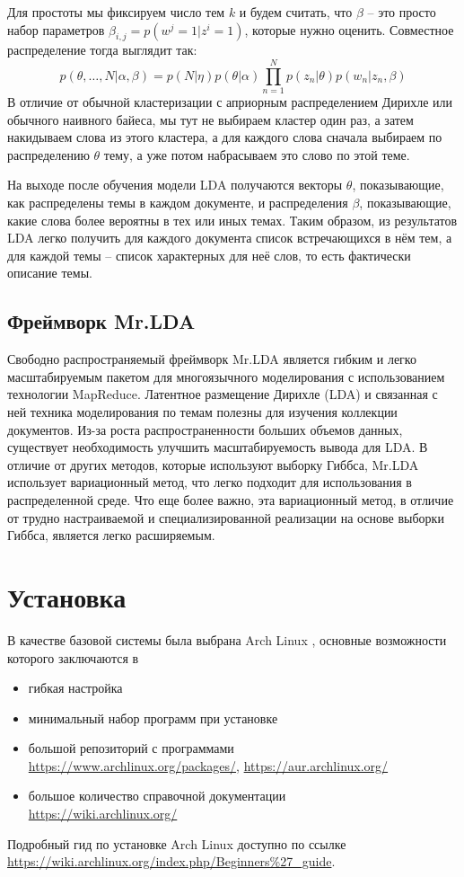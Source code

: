 Для простоты мы фиксируем число тем \( k \) и будем считать, что \( \beta \) -- это просто набор параметров 
\( \beta_{i,j} = p(w^j = 1 | z^i = 1)\), которые нужно оценить. Совместное распределение тогда выглядит так:
\[
    p(\theta,\ldots,N|\alpha,\beta) = 
        p(N|\eta)p(\theta|\alpha)\prod\limits_{n=1}^{N}p(z_n|\theta)p(w_n|z_n,\beta)
\]
В отличие от обычной кластеризации с априорным распределением Дирихле или обычного наивного байеса, мы тут 
не выбираем кластер один раз, а затем накидываем слова из этого кластера, а для каждого слова сначала 
выбираем по распределению \( \theta \) тему, а уже потом набрасываем это слово по этой теме.

На выходе после обучения модели LDA получаются векторы \( \theta \), показывающие, как распределены темы в 
каждом документе, и распределения \( \beta \), показывающие, какие слова более вероятны в тех или иных 
темах. Таким образом, из результатов LDA легко получить для каждого документа список встречающихся в нём 
тем, а для каждой темы -- список характерных для неё слов, то есть фактически описание темы.\cite{lda}

\section{Фреймворк Mr.LDA}
Свободно распространяемый фреймворк Mr.LDA \cite{mrldainfo} является гибким и легко масштабируемым пакетом 
для многоязычного моделирования с использованием технологии MapReduce. Латентное размещение Дирихле (LDA) и 
связанная с ней техника моделирования по темам полезны для изучения коллекции документов. Из-за роста 
распространенности больших объемов данных, существует необходимость улучшить масштабируемость вывода для 
LDA. В отличие от других методов, которые используют выборку Гиббса, Mr.LDA использует вариационный метод, 
что легко подходит для использования в распределенной среде. Что еще более важно, эта вариационный метод, в 
отличие от трудно настраиваемой и специализированной реализации на основе выборки Гиббса, является 
легко расширяемым.

\newpage

\chapter{Установка}
В качестве базовой системы была выбрана Arch Linux \cite{arch}, основные возможности которого заключаются в 
\begin{itemize}
    \item гибкая настройка
    \item минимальный набор программ при установке
    \item большой репозиторий с программами \\
        \url{https://www.archlinux.org/packages/}, \url{https://aur.archlinux.org/}
    \item большое количество справочной документации\\
        \url{https://wiki.archlinux.org/}
\end{itemize}
Подробный гид по установке Arch Linux доступно по ссылке\\
\url{https://wiki.archlinux.org/index.php/Beginners%27_guide}.

